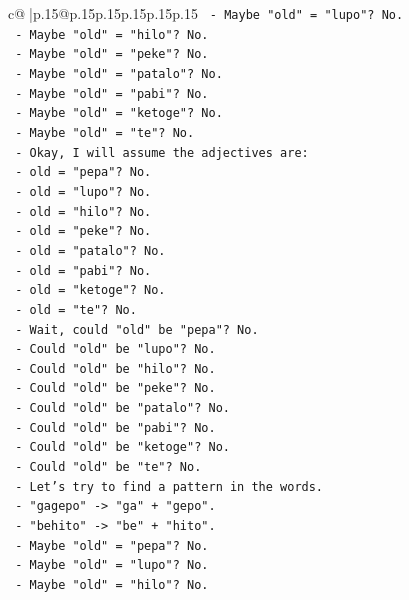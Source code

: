 \documentclass{article}
\begin{document}
{\begin{supertabular}{c@{$\;$}|p{.15\linewidth}@{}p{.15\linewidth}p{.15\linewidth}p{.15\linewidth}p{.15\linewidth}p{.15\linewidth}}
{{{\texttt{      {-} Maybe "old" = "lupo"? No.} \\
\texttt{      {-} Maybe "old" = "hilo"? No.} \\
\texttt{      {-} Maybe "old" = "peke"? No.} \\
\texttt{      {-} Maybe "old" = "patalo"? No.} \\
\texttt{      {-} Maybe "old" = "pabi"? No.} \\
\texttt{      {-} Maybe "old" = "ketoge"? No.} \\
\texttt{      {-} Maybe "old" = "te"? No.} \\
\texttt{      {-} Okay, I will assume the adjectives are:} \\
\texttt{        {-} old = "pepa"? No.} \\
\texttt{        {-} old = "lupo"? No.} \\
\texttt{        {-} old = "hilo"? No.} \\
\texttt{        {-} old = "peke"? No.} \\
\texttt{        {-} old = "patalo"? No.} \\
\texttt{        {-} old = "pabi"? No.} \\
\texttt{        {-} old = "ketoge"? No.} \\
\texttt{        {-} old = "te"? No.} \\
\texttt{      {-} Wait, could "old" be "pepa"? No.} \\
\texttt{      {-} Could "old" be "lupo"? No.} \\
\texttt{      {-} Could "old" be "hilo"? No.} \\
\texttt{      {-} Could "old" be "peke"? No.} \\
\texttt{      {-} Could "old" be "patalo"? No.} \\
\texttt{      {-} Could "old" be "pabi"? No.} \\
\texttt{      {-} Could "old" be "ketoge"? No.} \\
\texttt{      {-} Could "old" be "te"? No.} \\
\texttt{      {-} Let's try to find a pattern in the words.} \\
\texttt{      {-} "gagepo" {-}> "ga" + "gepo".} \\
\texttt{      {-} "behito" {-}> "be" + "hito".} \\
\texttt{      {-} Maybe "old" = "pepa"? No.} \\
\texttt{      {-} Maybe "old" = "lupo"? No.} \\
\texttt{      {-} Maybe "old" = "hilo"? No.} \\
}}}
\end{supertabular}}
\end{document}
